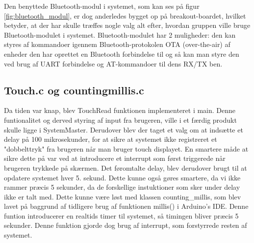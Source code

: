 Den benyttede Bluetooth-modul i systemet, som kan ses på figur \ref{fig:bluetooth_modul}, er dog anderledes bygget op på breakout-boardet, hvilket betyder, at der har skulle træffes nogle valg alt efter, hvordan gruppen ville bruge Bluetooth-modulet i systemet. Bluetooth-modulet har 2 muligheder: den kan styres af kommandoer igennem Bluetooth-protokolen OTA (over-the-air) af enheder den har oprettet en Bluetooth forbindelse til og så kan man styre den ved brug af UART forbindelse og AT-kommandoer til dens RX/TX ben.

\subsection{Touch.c og countingmillis.c}
Da tiden var knap, blev TouchRead funktionen implementeret i main. Denne funtionalitet og derved styring af input fra brugeren, ville i et færdig produkt skulle ligge i SystemMaster. Derudover blev der taget et valg om at indsætte et delay på 100 mikrosekunder, for at sikre at systemet ikke registreret et "dobbelttryk" fra brugeren når man bruger touch displayet. En smartere måde at sikre dette på var ved at introducere et interrupt som først triggerede når brugeren trykkede på skærmen. Det føromtalte delay, blev derudover brugt til at opdatere systemet hver 5. sekund. Dette kunne også gøres smartere, da vi ikke rammer præcis 5 sekunder, da de forskellige instuktioner som sker under delay ikke er talt med. Dette kunne være løst med klassen counting\_millis, som blev lavet på baggrund af tidligere brug af funktionen millis() i Arduino's IDE. Denne funtion introducerer en realtids timer til systemet, så timingen bliver præcis 5 sekunder. Denne funktion gjorde dog brug af interrupt, som forstyrrede resten af systemet.   

